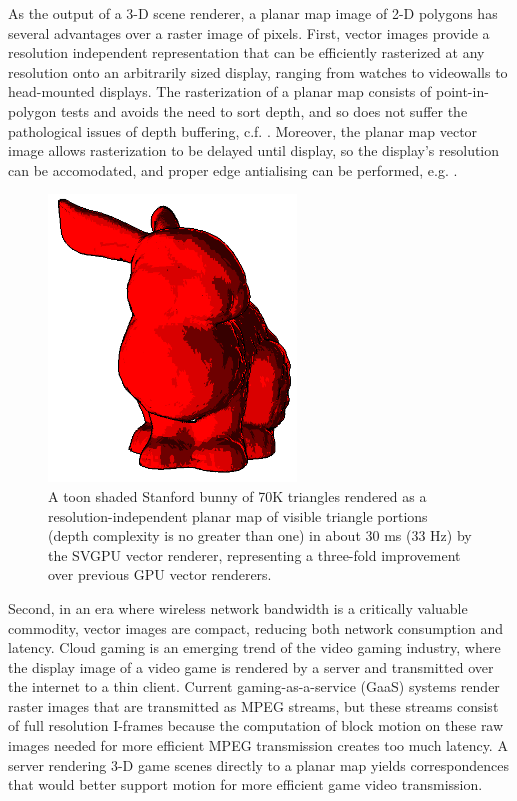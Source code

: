 \documentclass[review]{acmsiggraph}
\begin{document}
As the output of a 3-D scene renderer, a planar map image of 2-D polygons has
several advantages over a raster image of pixels. First, vector images provide
a resolution independent representation that can be efficiently rasterized at
any resolution onto an arbitrarily sized display, ranging from watches to
videowalls to head-mounted displays. The rasterization of a planar map consists
of point-in-polygon
tests and avoids the need to sort depth, and so does not suffer the
pathological issues of depth buffering, c.f. \cite{lapidous1999}. Moreover, the
planar map vector image allows rasterization to be delayed until display, so
the display's resolution can be accomodated, and proper edge antialising can be
performed, e.g. \cite{manson2011}.

\begin{figure}[t] \centering
\includegraphics[height=3in]{images/bunny-red.png}
\caption{A toon shaded Stanford bunny of 70K triangles rendered as a
resolution-independent planar map of visible triangle portions (depth
complexity is no greater than one) in about 30 ms (33 Hz) by the SVGPU vector
renderer, representing a three-fold improvement over previous GPU vector
renderers.}
\end{figure}

Second, in an era where wireless network bandwidth is a critically
valuable commodity, vector images are compact, reducing both network
consumption and latency. Cloud gaming is an emerging trend of the video gaming
industry, where the display image of a video game is rendered by a server and
transmitted over the internet to a thin client. Current gaming-as-a-service
(GaaS) systems render raster images that are transmitted as MPEG streams, but
these streams consist of full resolution I-frames because the computation of
block motion on these raw images needed for more efficient MPEG transmission
creates too much latency. A server rendering 3-D game scenes directly to a
planar map yields correspondences that would better support motion for more
efficient game video transmission.
\end{document}
